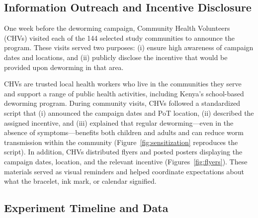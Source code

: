 \documentclass[12pt,a4paper]{article}
\begin{document}

\subsection{Information Outreach and Incentive Disclosure}\label{sec:info-campaign} 

One week before the deworming campaign, Community Health Volunteers (CHVs) visited each of the 144 selected study communities to announce the program. These visits served two purposes: (i) ensure high awareness of campaign dates and locations, and (ii) publicly disclose the incentive that would be provided upon deworming in that area.

CHVs are trusted local health workers who live in the communities they serve and support a range of public health activities, including Kenya’s school-based deworming program. During community visits, CHVs followed a standardized script that (i) announced the campaign dates and PoT location, (ii) described the assigned incentive, and (iii) explained that regular deworming---even in the absence of symptoms---benefits both children and adults and can reduce worm transmission within the community (Figure~\ref{fig:sensitization} reproduces the script). In addition, CHVs distributed flyers and posted posters displaying the campaign dates, location, and the relevant incentive (Figures~\ref{fig:flyers}). These materials 
served as visual reminders and helped coordinate expectations about what the bracelet, ink mark, or calendar signified.


\subsection{Experiment Timeline and Data}
\end{document}
